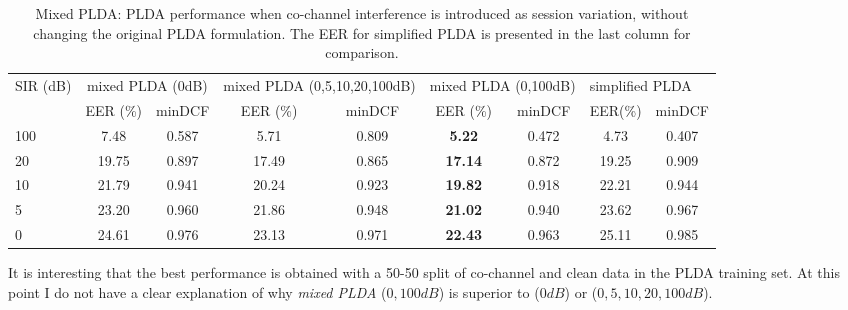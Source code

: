 \begin{table}[b!]
	\small
	\centering
	\resizebox{\textwidth}{!}
	{
		\begin{tabular}{|l|c|c|c|c|c|c|c|c|c|c|c|}
		\hline
		\multirow{2}{*}{SIR (dB)} & \multicolumn{3}{c|}{mixed PLDA (0dB)}          & \multicolumn{3}{c|}{mixed PLDA (0,5,10,20,100dB)}  & \multicolumn{3}{c|}{mixed PLDA (0,100dB)}       & \multicolumn{2}{l|}{simplified PLDA} \\ \cline{2-12} 
		& \multicolumn{2}{r|}{EER (\%)} & minDCF         & \multicolumn{2}{c|}{EER (\%)} & minDCF             & \multicolumn{2}{c|}{EER (\%)} & minDCF          & EER(\%)           & minDCF           \\ \hline
		100                       & \multicolumn{2}{c|}{7.48}     & 0.587          & \multicolumn{2}{c|}{5.71}     & 0.809              & \multicolumn{2}{c|}{\bf 5.22}     & 0.472           & 4.73              & 0.407            \\ \hline
		20                        & \multicolumn{2}{c|}{19.75}    & 0.897          & \multicolumn{2}{c|}{17.49}    & 0.865              & \multicolumn{2}{c|}{\bf 17.14}    & 0.872           & 19.25             & 0.909            \\ \hline
		10                        & \multicolumn{2}{c|}{21.79}    & 0.941          & \multicolumn{2}{c|}{20.24}    & 0.923              & \multicolumn{2}{c|}{\bf 19.82}    & 0.918           & 22.21             & 0.944            \\ \hline
		5                         & \multicolumn{2}{c|}{23.20}    & 0.960          & \multicolumn{2}{c|}{21.86}    & 0.948              & \multicolumn{2}{c|}{\bf 21.02}    & 0.940           & 23.62             & 0.967            \\ \hline
		0                         & \multicolumn{2}{c|}{24.61}    & 0.976          & \multicolumn{2}{c|}{23.13}    & 0.971              & \multicolumn{2}{c|}{\bf 22.43}    & 0.963           & 25.11             & 0.985            \\ \hline
	\end{tabular}
	}
	\caption{Mixed PLDA: PLDA performance when co-channel interference is introduced as session variation, without changing the original PLDA formulation. The EER for simplified PLDA is presented in the last column for comparison. }
	\label{tbl:mixed_plda}
\end{table}

It is interesting that the best performance is obtained with a 50-50 split of co-channel and clean data in the PLDA training set. 
At this point I do not have a clear explanation of why {\it mixed PLDA} ($0,100dB$) is superior to ($0dB$) or ($0,5,10,20,100dB$). 

